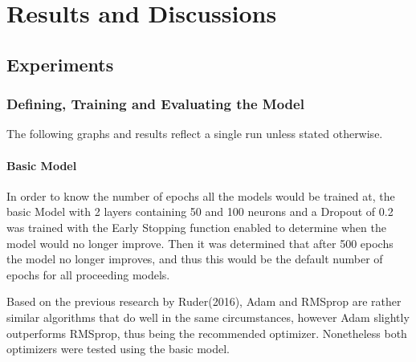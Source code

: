 ﻿\documentclass[10pt,11pt,12pt,oneside]{book}
\begin{document}
\chapter{Results and Discussions}
\section{Experiments}

\subsection{Defining, Training and Evaluating the Model}
The following graphs and results reflect a single run unless stated otherwise.
\subsubsection{Basic Model}
In order to know the number of epochs all the models would be trained at, the basic Model with 2 layers containing 50 and 100 neurons and a Dropout of 0.2 was trained with the Early Stopping function enabled to determine when the model would no longer improve. Then it was determined that after 500 epochs the model no longer improves, and thus this would be the default number of epochs for all proceeding models.

Based on the previous research by Ruder(2016), Adam
and RMSprop are rather similar algorithms that do well in the same circumstances, however Adam slightly outperforms RMSprop, thus being the recommended optimizer. \cite{DBLP:journals/corr/Ruder16} Nonetheless both optimizers were tested using the basic model.\\
\end{document}
